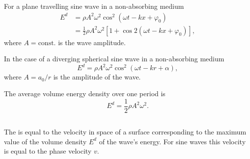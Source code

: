 For a plane travelling sine wave in a non-absorbing medium 
\begin{align*}%
E^{d} & = \rho A^{2} \omega^{2} \cos^{2} (\omega t - kx + \varphi_{0}) \\
& = \frac{1}{2} \rho A^{2}\omega^{2} [1 + \cos 2(\omega t - kx + \varphi_{0})],
\end{align*}
where $A = \text{const.}$ is the wave amplitude.

In the case of a diverging spherical sine wave in a non-absorbing medium 
\begin{equation*}%
E^{d} = \rho A^{2}\omega^{2}\cos^{2} (\omega t - kr + \alpha),
\end{equation*}
where $A = a_{0}/r$ is the amplitude of the wave.

The average volume energy density over one period is
\begin{equation*}%
E^{d} = \frac{1}{2} \rho A^{2} \omega^{2}.
\end{equation*}

\subsection{}\label{30.3.5} The  is equal to the velocity in space of a surface corresponding to the maximum value of the volume density $E^{d}$ of the wave's energy. For sine waves this velocity is equal to the phase velocity $v$.

